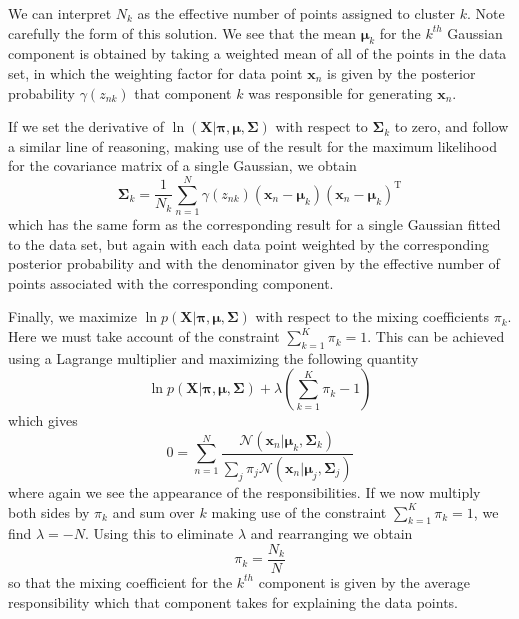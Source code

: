 \documentclass[a4paper, 11pt]{article}
\numberwithin{equation}{subsection}
\begin{document}
We can interpret $N_k$ as the effective number of points assigned to cluster $k$. Note carefully the form of this solution. We see that the mean $\boldsymbol\mu_k$ for the $k^{th}$ Gaussian component is obtained by taking a weighted mean of all of the points in the data set, in which the weighting factor for data point $\mathbf x_n$ is given by the posterior probability $\gamma(z_{nk})$ that component $k$ was responsible for generating $\mathbf x_n$.

If we set the derivative of $\ln(\mathbf X|\boldsymbol\pi,\boldsymbol\mu,\boldsymbol\Sigma)$ with respect to $\boldsymbol\Sigma_k$ to zero, and follow a similar line of reasoning, making use of the result for the maximum likelihood for the covariance matrix of a single Gaussian, we obtain
\begin{equation}
\boldsymbol\Sigma_k=\frac{1}{N_k}\sum^N_{n=1}\gamma(z_{nk})(\mathbf x_n-\boldsymbol\mu_k)(\mathbf x_n-\boldsymbol\mu_k)^{\mathrm T}
\end{equation}
which has the same form as the corresponding result for a single Gaussian fitted to the data set, but again with each data point weighted by the corresponding posterior
probability and with the denominator given by the effective number of points associated with the corresponding component.

Finally, we maximize $\ln p(\mathbf X|\boldsymbol\pi,\boldsymbol\mu,\boldsymbol\Sigma)$ with respect to the mixing coefficients $\pi_k$. Here we must take account of the constraint $\sum_{k=1}^K\pi_k=1$. This can be achieved using a Lagrange multiplier and maximizing the following quantity
\begin{equation}
\ln p(\mathbf X|\boldsymbol\pi,\boldsymbol\mu,\boldsymbol\Sigma)+\lambda(\sum_{k=1}^K\pi_k-1)
\end{equation}
which gives
\begin{equation}
0=\sum_{n=1}^N\frac{\mathcal N(\mathbf x_n|\boldsymbol\mu_k,\boldsymbol\Sigma_k)}{\sum_j\pi_j\mathcal N(\mathbf x_n|\boldsymbol\mu_j,\boldsymbol\Sigma_j)}
\end{equation}
where again we see the appearance of the responsibilities. If we now multiply both sides by $\pi_k$ and sum over $k$ making use of the constraint $\sum_{k=1}^K\pi_k=1$, we find $\lambda=-N$. Using this to eliminate $\lambda$ and rearranging we obtain
\begin{equation}
\pi_k=\frac{N_k}{N}
\end{equation}
so that the mixing coefficient for the $k^{th}$ component is given by the average responsibility which that component takes for explaining the data points.
\end{document}
